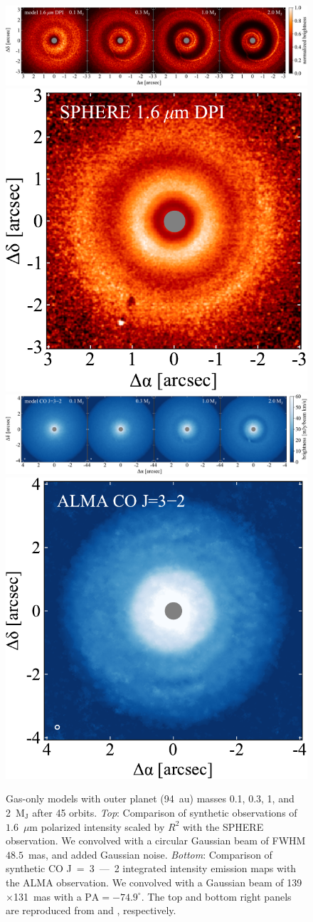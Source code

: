 \documentclass[usenatbib,a4paper,times]{mnras}
\begin{document}
\begin{figure}
   \begin{center}
      \includegraphics[height=0.206\textwidth]{figs/scattered-image.pdf} \quad
      \includegraphics[height=0.206\textwidth]{figs/van-boekel-2017.pdf}
      \includegraphics[height=0.206\textwidth]{figs/CO-image.pdf} \quad
      \includegraphics[height=0.206\textwidth]{figs/huang-2018.pdf}
      \caption{Gas-only models with outer planet (94~au) masses 0.1, 0.3, 1, and
         2~$\mathrm{M_J}$ after 45 orbits. \textit{Top}: Comparison of synthetic
         observations of $1.6$~$\mu$m polarized intensity scaled by $R^2$ with
         the SPHERE observation. We convolved with a circular Gaussian beam of
         FWHM $48.5$~mas, and added Gaussian noise. \textit{Bottom}: Comparison
         of synthetic CO J~=~3~---~2 integrated intensity emission maps with the
         ALMA observation. We convolved with a Gaussian beam of
         139$\times$131~mas with a $\mathrm{PA} = -74.9^{\circ}$. The top and
         bottom right panels are reproduced from \citet{van-boekel:2017} and
         \citet{huang:2018}, respectively.\label{fig:scattered-CO}}
   \end{center}
\end{figure}
\end{document}
